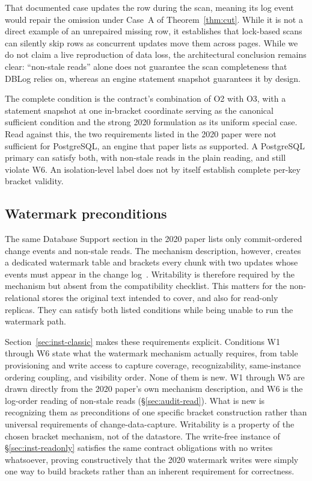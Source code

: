 \documentclass[sigconf,nonacm,10pt]{acmart}
\theoremstyle{plain}
\theoremstyle{definition}
\begin{document}
That documented case updates the row during the scan, meaning its log event 
would repair the omission under Case~A of Theorem~\ref{thm:cut}. While it is not a direct 
example of an unrepaired missing row, it establishes that lock-based scans can 
silently skip rows as concurrent updates move them across pages. While we do not 
claim a live reproduction of data loss, the architectural conclusion remains 
clear: ``non-stale reads'' alone does not guarantee the scan completeness that 
DBLog relies on, whereas an engine statement snapshot guarantees it by design.

The complete condition is the contract's combination of O2 with O3, with a 
statement snapshot at one in-bracket coordinate serving as the canonical
sufficient condition and the strong
2020 formulation as its uniform special case. Read against this, the two requirements
listed in the 2020 paper were not sufficient for PostgreSQL, an engine that
paper lists as supported. A PostgreSQL primary can satisfy both, with
non-stale reads in the plain reading, and still violate W6.
An isolation-level label does not by itself establish complete per-key bracket
validity.

\subsection{Watermark preconditions}\label{sec:audit-write}
The same Database Support section in the 2020 paper lists only commit-ordered 
change events and non-stale reads. The mechanism description, however, creates a 
dedicated watermark table and brackets every chunk with two updates whose events 
must appear in the change log~\cite{andreakis2020dblog}. Writability is therefore 
required by the mechanism but absent from the compatibility checklist. This 
matters for the non-relational stores the original text intended to cover,
and also for read-only replicas. They can satisfy both listed conditions
while being unable to
run the watermark path.

Section~\ref{sec:inst-classic} makes these requirements explicit. Conditions W1 
through W6 state what the watermark mechanism actually requires, from table
provisioning and write access to capture coverage, recognizability,
same-instance ordering coupling, and visibility order. None of them is new. W1
through W5 are drawn directly from the 2020 paper's own mechanism description,
and W6 is the log-order reading of non-stale reads
(\S\ref{sec:audit-read}). What is new is recognizing them
as preconditions of one specific bracket construction rather than universal 
requirements of change-data-capture. Writability is a property of the chosen 
bracket mechanism, not of the datastore. The write-free instance of 
\S\ref{sec:inst-readonly} satisfies the same contract obligations with no writes 
whatsoever, proving constructively that the 2020 watermark writes were simply one 
way to build brackets rather than an inherent requirement for correctness.
\end{document}
